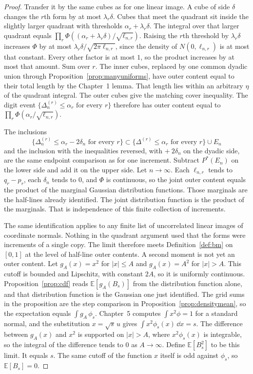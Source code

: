 \begin{proof}
Transfer it by the same cubes as for one linear image. A cube of side $\delta$ changes the $r$th form by at most $\lambda_r\delta$. Cubes that meet the quadrant sit inside the slightly larger quadrant with thresholds $\alpha_r+\lambda_r\delta$. The integral over that larger quadrant equals $\prod_r\Phi((\alpha_r+\lambda_r\delta)/\sqrt{\ell_{n,r}})$. Raising the $r$th threshold by $\lambda_r\delta$ increases $\Phi$ by at most $\lambda_r\delta/\sqrt{2\pi\ell_{n,r}}$, since the density of $N(0,\ell_{n,r})$ is at most that constant. Every other factor is at most $1$, so the product increases by at most that amount. Sum over $r$. The inner cubes, replaced by one common dyadic union through Proposition~\ref{prop:manyuniforms}, have outer content equal to their total length by the Chapter~1 lemma. That length lies within an arbitrary $\eta$ of the quadrant integral. The outer cubes give the matching cover inequality. The digit event $\{\Delta_n^{(r)}\le\alpha_r\text{ for every }r\}$ therefore has outer content equal to $\prod_r\Phi(\alpha_r/\sqrt{\ell_{n,r}})$.

The inclusions
\[
 \{\Delta_n^{(r)}\le\alpha_r-2\delta_n\text{ for every }r\}
 \subset\{\Delta^{(r)}\le\alpha_r\text{ for every }r\}\cup E_n
\]
and the inclusion with the inequalities reversed, with $+\ 2\delta_n$ on the dyadic side, are the same endpoint comparison as for one increment. Subtract $P^*(E_n)$ on the lower side and add it on the upper side. Let $n\to\infty$. Each $\ell_{n,r}$ tends to $q_r-p_r$, each $\delta_n$ tends to $0$, and $\Phi$ is continuous, so the joint outer content equals the product of the marginal Gaussian distribution functions. Those marginals are the half-lines already identified. The joint distribution function is the product of the marginals. That is independence of this finite collection of increments.

The same identification applies to any finite list of uncorrelated linear images of coordinate normals. Nothing in the quadrant argument used that the forms were increments of a single copy. The limit therefore meets Definition~\ref{def:bm} on $[0,1]$ at the level of half-line outer contents. A second moment is not yet an outer content. Let $g_A(x)=x^2$ for $|x|\le A$ and $g_A(x)=A^2$ for $|x|>A$. This cutoff is bounded and Lipschitz, with constant $2A$, so it is uniformly continuous. Proposition~\ref{prop:cdf} reads $\mathbb E[g_A(B_s)]$ from the distribution function alone, and that distribution function is the Gaussian one just identified. The grid sums in the proposition are the step comparison in Proposition~\ref{prop:densitymean}, so the expectation equals $\int g_A\,\phi_s$. Chapter~5 computes $\int x^2\phi=1$ for a standard normal, and the substitution $x=\sqrt s\,u$ gives $\int x^2\phi_s(x)\,\dd x=s$. The difference between $g_A(x)$ and $x^2$ is supported on $|x|>A$, where $x^2\phi_s(x)$ is integrable, so the integral of the difference tends to $0$ as $A\to\infty$. Define $\mathbb E[B_s^2]$ to be this limit. It equals $s$. The same cutoff of the function $x$ itself is odd against $\phi_s$, so $\mathbb E[B_s]=0$.


\end{proof}
